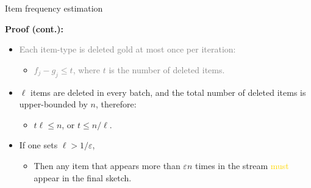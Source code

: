 \documentclass[first=dgreen,second=purple,logo=redque]{aaltoslides}
\begin{document}
\begin{frame}[allowframebreaks=1]{Item frequency estimation}
\framebreak

\textbf{Proof (cont.):}

\begin{itemize}
   \item \textcolor{gray}{Each item-type is deleted gold at most
   once per iteration:}
   \begin{itemize} \item \textcolor{gray}{$f_{j} - g_{j} \leq t$, where $t$ is
   the number of deleted items.}\end{itemize}
   \item $\ell$ items are deleted in every batch, and the total number of
   deleted items is upper-bounded by $n$, therefore:
   \begin{itemize} \item $t\ell \leq n$, or $t \leq n/\ell$.\end{itemize} 
\end{itemize}

\begin{itemize}
  \item If one sets $\ell > 1/\varepsilon$,
  \begin{itemize} \item Then any item that appears more than
  $\varepsilon n$ times in the stream \textcolor{gold}{must} appear in
  the final sketch.\end{itemize}
\end{itemize}
  
\end{frame}
\end{document}
